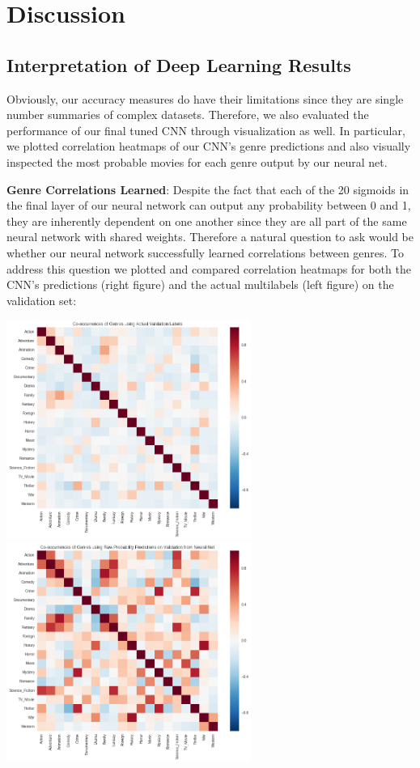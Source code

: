 \documentclass{article}
\begin{document}
\section{Discussion}    
    \subsection{Interpretation of Deep Learning Results}
    
    \indent 
    
    Obviously, our accuracy measures do have their limitations since they are single number summaries of complex datasets. Therefore, we also evaluated the performance of our final tuned CNN through visualization as well. In particular, we plotted correlation heatmaps of our CNN's genre predictions and also visually inspected the most probable movies for each genre output by our neural net.
        
        \textbf{Genre Correlations Learned}:
        Despite the fact that each of the 20 sigmoids in the final layer of our neural network can output any probability between 0 and 1, they are inherently dependent on one another since they are all part of the same neural network with shared weights. Therefore a natural question to ask would be whether our neural network successfully learned correlations between genres. To address this question we plotted and compared correlation heatmaps for both the CNN's predictions (right figure) and the actual multilabels (left figure) on the validation set:
        
        \begin{center}
            \includegraphics[width=8cm]{heatmap_actual.png}
            \includegraphics[width=8cm]{heatmap_pred.png}
        \end{center}
        
\end{document}
